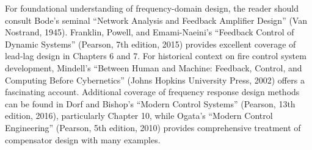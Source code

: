 For foundational understanding of frequency-domain design, the reader should consult Bode's seminal ``Network Analysis and Feedback Amplifier Design'' (Van Nostrand, 1945). Franklin, Powell, and Emami-Naeini's ``Feedback Control of Dynamic Systems'' (Pearson, 7th edition, 2015) provides excellent coverage of lead-lag design in Chapters 6 and 7. For historical context on fire control system development, Mindell's ``Between Human and Machine: Feedback, Control, and Computing Before Cybernetics'' (Johns Hopkins University Press, 2002) offers a fascinating account. Additional coverage of frequency response design methods can be found in Dorf and Bishop's ``Modern Control Systems'' (Pearson, 13th edition, 2016), particularly Chapter 10, while Ogata's ``Modern Control Engineering'' (Pearson, 5th edition, 2010) provides comprehensive treatment of compensator design with many examples.

